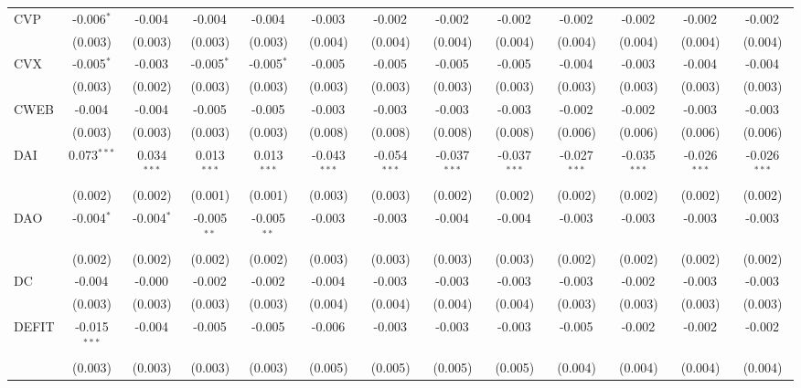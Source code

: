 \begin{table}[!htbp]
\begin{tabular}{@{\extracolsep{5pt}}lcccccccccccc}
 CVP & -0.006$^{*}$ & -0.004$^{}$ & -0.004$^{}$ & -0.004$^{}$ & -0.003$^{}$ & -0.002$^{}$ & -0.002$^{}$ & -0.002$^{}$ & -0.002$^{}$ & -0.002$^{}$ & -0.002$^{}$ & -0.002$^{}$ \\
  & (0.003) & (0.003) & (0.003) & (0.003) & (0.004) & (0.004) & (0.004) & (0.004) & (0.004) & (0.004) & (0.004) & (0.004) \\
 CVX & -0.005$^{*}$ & -0.003$^{}$ & -0.005$^{*}$ & -0.005$^{*}$ & -0.005$^{}$ & -0.005$^{}$ & -0.005$^{}$ & -0.005$^{}$ & -0.004$^{}$ & -0.003$^{}$ & -0.004$^{}$ & -0.004$^{}$ \\
  & (0.003) & (0.002) & (0.003) & (0.003) & (0.003) & (0.003) & (0.003) & (0.003) & (0.003) & (0.003) & (0.003) & (0.003) \\
 CWEB & -0.004$^{}$ & -0.004$^{}$ & -0.005$^{}$ & -0.005$^{}$ & -0.003$^{}$ & -0.003$^{}$ & -0.003$^{}$ & -0.003$^{}$ & -0.002$^{}$ & -0.002$^{}$ & -0.003$^{}$ & -0.003$^{}$ \\
  & (0.003) & (0.003) & (0.003) & (0.003) & (0.008) & (0.008) & (0.008) & (0.008) & (0.006) & (0.006) & (0.006) & (0.006) \\
 DAI & 0.073$^{***}$ & 0.034$^{***}$ & 0.013$^{***}$ & 0.013$^{***}$ & -0.043$^{***}$ & -0.054$^{***}$ & -0.037$^{***}$ & -0.037$^{***}$ & -0.027$^{***}$ & -0.035$^{***}$ & -0.026$^{***}$ & -0.026$^{***}$ \\
  & (0.002) & (0.002) & (0.001) & (0.001) & (0.003) & (0.003) & (0.002) & (0.002) & (0.002) & (0.002) & (0.002) & (0.002) \\
 DAO & -0.004$^{*}$ & -0.004$^{*}$ & -0.005$^{**}$ & -0.005$^{**}$ & -0.003$^{}$ & -0.003$^{}$ & -0.004$^{}$ & -0.004$^{}$ & -0.003$^{}$ & -0.003$^{}$ & -0.003$^{}$ & -0.003$^{}$ \\
  & (0.002) & (0.002) & (0.002) & (0.002) & (0.003) & (0.003) & (0.003) & (0.003) & (0.002) & (0.002) & (0.002) & (0.002) \\
 DC & -0.004$^{}$ & -0.000$^{}$ & -0.002$^{}$ & -0.002$^{}$ & -0.004$^{}$ & -0.003$^{}$ & -0.003$^{}$ & -0.003$^{}$ & -0.003$^{}$ & -0.002$^{}$ & -0.003$^{}$ & -0.003$^{}$ \\
  & (0.003) & (0.003) & (0.003) & (0.003) & (0.004) & (0.004) & (0.004) & (0.004) & (0.003) & (0.003) & (0.003) & (0.003) \\
 DEFIT & -0.015$^{***}$ & -0.004$^{}$ & -0.005$^{}$ & -0.005$^{}$ & -0.006$^{}$ & -0.003$^{}$ & -0.003$^{}$ & -0.003$^{}$ & -0.005$^{}$ & -0.002$^{}$ & -0.002$^{}$ & -0.002$^{}$ \\
  & (0.003) & (0.003) & (0.003) & (0.003) & (0.005) & (0.005) & (0.005) & (0.005) & (0.004) & (0.004) & (0.004) & (0.004) \\

\end{tabular}
\end{table}
